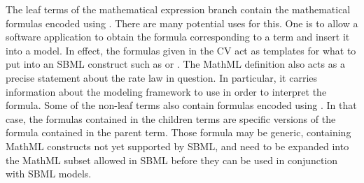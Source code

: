 \begin{blockChanged}
The leaf terms of the mathematical expression branch contain the mathematical formulas encoded using \mathmltwo.  There are many potential uses
for this.  One is to allow a software application to obtain the
formula corresponding to a term and insert it into a model.  In effect, the formulas given
in the CV act as templates for what to put into an SBML construct such as
\KineticLaw or \Rule.  The MathML definition also acts as a
precise statement about the rate law in question. In particular, it carries information about the modeling framework to use in order to interpret the formula.  Some of the
non-leaf terms also contain formulas encoded using \mathmltwo. In that case, the formulas contained in the children terms are specific versions of the formula contained in the parent term. 
Those formula may be generic, containing MathML constructs
not yet supported by SBML, and need to be expanded into
the MathML subset allowed in SBML before they can be
used in conjunction with SBML models.
\end{blockChanged}

